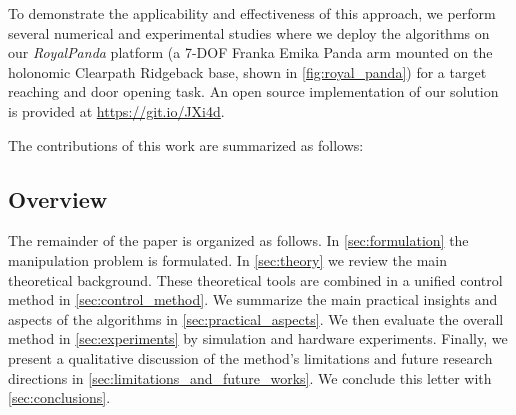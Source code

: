 To demonstrate the applicability and effectiveness of this approach, we perform several numerical and experimental studies where we deploy the algorithms on our \textit{RoyalPanda} platform (a 7-DOF Franka Emika Panda arm mounted on the holonomic Clearpath Ridgeback base, shown in \fig\ref{fig:royal_panda}) for a target reaching and door opening task. An open source implementation of our solution is provided at \url{https://git.io/JXi4d}.

The contributions of this work are summarized as follows:


\subsection{Overview}

The remainder of the paper is organized as follows. In 
\sect \ref{sec:formulation} the manipulation problem is formulated. In \sect \ref{sec:theory} we review the main theoretical background. These theoretical tools are combined in a unified control method in \sect \ref{sec:control_method}. We summarize the main practical insights and aspects of the algorithms in \sect \ref{sec:practical_aspects}.
We then evaluate the overall method in \sect \ref{sec:experiments} by simulation and hardware experiments. Finally, we present a qualitative discussion of the method's limitations and future research directions in \sect \ref{sec:limitations_and_future_works}. We conclude this letter with \sect \ref{sec:conclusions}.
